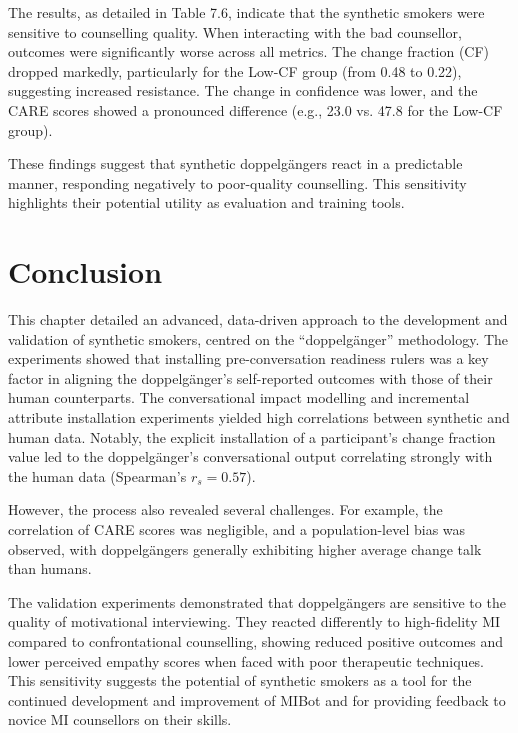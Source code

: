 The results, as detailed in Table 7.6, indicate that the synthetic smokers were sensitive to counselling quality. When interacting with the bad counsellor, outcomes were significantly worse across all metrics. The change fraction (CF) dropped markedly, particularly for the Low-CF group (from 0.48 to 0.22), suggesting increased resistance. The change in confidence was lower, and the CARE scores showed a pronounced difference (e.g., 23.0 vs. 47.8 for the Low-CF group).

These findings suggest that synthetic doppelgängers react in a predictable manner, responding negatively to poor-quality counselling. This sensitivity highlights their potential utility as evaluation and training tools.

\section{Conclusion}

This chapter detailed an advanced, data-driven approach to the development and validation of synthetic smokers, centred on the ``doppelgänger'' methodology. The experiments showed that installing pre-conversation readiness rulers was a key factor in aligning the doppelgänger's self-reported outcomes with those of their human counterparts. The conversational impact modelling and incremental attribute installation experiments yielded high correlations between synthetic and human data. Notably, the explicit installation of a participant's change fraction value led to the doppelgänger's conversational output correlating strongly with the human data (Spearman's $r_{s}=0.57$).

However, the process also revealed several challenges. For example, the correlation of CARE scores was negligible, and a population-level bias was observed, with doppelgängers generally exhibiting higher average change talk than humans.

The validation experiments demonstrated that doppelgängers are sensitive to the quality of motivational interviewing. They reacted differently to high-fidelity MI compared to confrontational counselling, showing reduced positive outcomes and lower perceived empathy scores when faced with poor therapeutic techniques. This sensitivity suggests the potential of synthetic smokers as a tool for the continued development and improvement of MIBot and for providing feedback to novice MI counsellors on their skills.